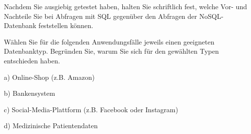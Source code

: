 \documentclass[11pt, a4paper, oneside]{article}
\begin{document}
	Nachdem Sie ausgiebig getestet haben, halten Sie schriftlich fest, welche Vor- und Nachteile Sie bei Abfragen mit SQL gegenüber den Abfragen der NoSQL-Datenbank feststellen können.
	
	\boxarea[13cm]
	
	\pagebreak
	
	
	Wählen Sie für die folgenden Anwendungsfälle jeweils einen geeigneten Datenbanktyp.
	Begründen Sie, warum Sie sich für den gewählten Typen entschieden haben.
	
	a) Online-Shop (z.B. Amazon)	
	
	\lines[3cm]
	
	b) Bankensystem
	
	\lines[3cm]
	
	c) Social-Media-Plattform (z.B. Facebook oder Instagram)
	
	\lines[3cm]
	
	d) Medizinische Patientendaten
	
	\lines[3cm]
\end{document}
